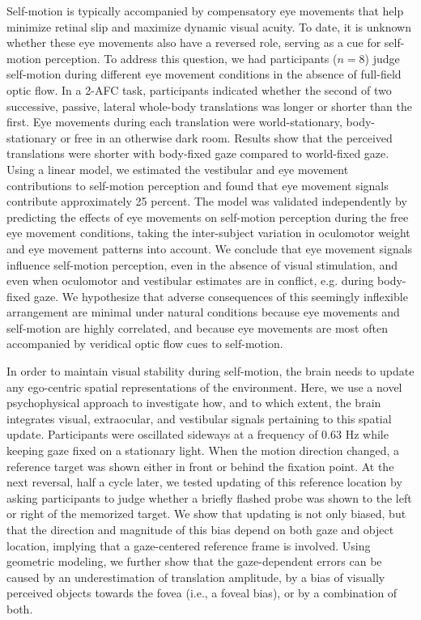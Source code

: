 Self-motion is typically accompanied by compensatory eye movements that help minimize retinal slip and maximize dynamic visual acuity. To date, it is unknown whether these eye movements also have a reversed role, serving as a cue for self-motion perception. To address this question, we had participants ($n=8$) judge self-motion during different eye movement conditions in the absence of full-field optic flow.  In a 2-AFC task, participants indicated whether the second of two successive, passive, lateral whole-body translations was longer or shorter than the first. Eye movements during each translation were world-stationary, body-stationary or free in an otherwise dark room. Results show that the perceived translations were shorter with body-fixed gaze compared to world-fixed gaze. Using a linear model, we estimated the vestibular and eye movement contributions to self-motion perception and found that eye movement signals contribute approximately 25 percent. The model was validated independently by predicting the effects of eye movements on self-motion perception during the free eye movement conditions, taking the inter-subject variation in oculomotor weight and eye movement patterns into account. We conclude that eye movement signals influence self-motion perception, even in the absence of visual stimulation, and even when oculomotor and vestibular estimates are in conflict, e.g. during body-fixed gaze. We hypothesize that adverse consequences of this seemingly inflexible arrangement are minimal under natural conditions because eye movements and self-motion are highly correlated, and because eye movements are most often accompanied by veridical optic flow cues to self-motion.


In order to maintain visual stability during self-motion, the brain needs to update any ego-centric spatial representations of the environment. Here, we use a novel psychophysical approach to investigate how, and to which extent, the brain integrates visual, extraocular, and vestibular signals pertaining to this spatial update. Participants were oscillated sideways at a frequency of 0.63 Hz while keeping gaze fixed on a stationary light. When the motion direction changed, a reference target was shown either in front or behind the fixation point. At the next reversal, half a cycle later, we tested updating of this reference location by asking participants to judge whether a briefly flashed probe was shown to the left or right of the memorized target. We show that updating is not only biased, but that the direction and magnitude of this bias depend on both gaze and object location, implying that a gaze-centered reference frame is involved. Using geometric modeling, we further show that the gaze-dependent errors can be caused by an underestimation of translation amplitude, by a bias of visually perceived objects towards the fovea (i.e., a foveal bias), or by a combination of both.

